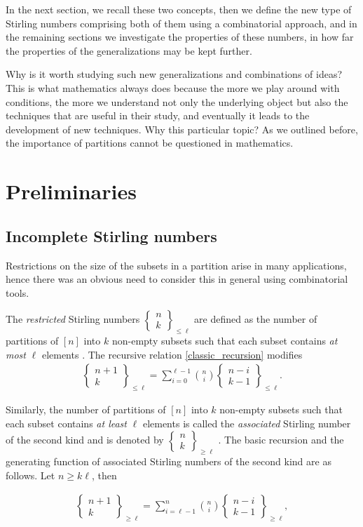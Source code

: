 \documentclass[12pt, reqno]{amsart}
\newtheorem{proof 1}{proof 1}
\def\sts#1#2{\begin{Bmatrix}
#1 \\ #2 \end{Bmatrix}}
\begin{document}
In the next section, we recall these two concepts, then we define the new type of Stirling numbers comprising both of them using a combinatorial approach, and in the remaining sections we investigate the properties of these numbers, in how far the properties of the generalizations may be kept further. 

Why is it worth studying such new generalizations and  combinations of ideas? This is what mathematics always does because the more we play around with conditions, the more we understand not only the underlying object but also the techniques that are useful in their study, and eventually it leads to the development of new techniques. Why this particular topic? As we outlined before, the importance of partitions cannot be questioned in mathematics. 

\section{Preliminaries}
\subsection{Incomplete Stirling numbers}
Restrictions on the size of the subsets in a partition arise in many applications, hence there was an obvious need to consider this in general using combinatorial tools.   
 

The \emph{restricted} Stirling numbers $\sts{n}{k}_{\leq \ell}$ are defined as the number of partitions of $[n]$ into $k$ non-empty subsets such that each subset contains \emph{at most} $\ell$ elements \cite{komatsu2015incomplete,mezo2014periodicity,choi2006reciprocity}. The recursive relation \eqref{classic_recursion} modifies 
\begin{align}\label{restricted_recursion}
	\sts{n+1}{k}_{\leq \ell}=\sum\limits_{i=0}^{\ell-1}\binom{n}{i}\sts{n-i}{k-1}_{\leq \ell}.
\end{align}



Similarly, the number of partitions of $[n]$ into $k$ non-empty subsets such that each subset contains \emph{at least} $\ell$ elements is called the \emph{associated} Stirling number of the second kind and is denoted by $\sts{n}{k}_{\geq \ell}$ \cite{howard1980associated,kim2022degenerate, komatsu2015incomplete,mezo2014periodicity}. The basic recursion and the generating function of associated Stirling numbers of the second kind are as follows. Let $n\geq k\ell$, then

\begin{align*}
	\sts{n+1}{k}_{\geq \ell}=\sum_{i=\ell-1}^{n}\binom{n}{i}\sts{n-i}{k-1}_{\geq \ell},
\end{align*}
\end{document}
